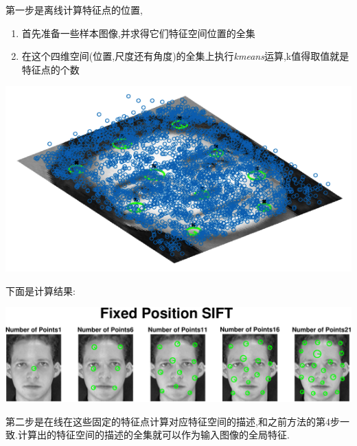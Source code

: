 	第一步是离线计算特征点的位置,
	\begin{enumerate}
		\item 首先准备一些样本图像,并求得它们特征空间位置的全集
		\item 在这个四维空间(位置,尺度还有角度)的全集上执行\textit{kmeans}运算,k值得取值就是特征点的个数
	\end{enumerate}
	
				\begin{center}
		\begin{minipage}[t]{\linewidth}
		\center
		{
		\includegraphics[width=\MyFactor\textwidth]{Img/c3/sift_face_kmeans} 
		}
		\end{minipage}
		\medskip
		\end{center}
		下面是计算结果:
			\begin{center}
		\begin{minipage}[t]{\linewidth}
		\center
		{
		\includegraphics[width=\MyFactor\textwidth]{Img/c3/sift_fixedp} 
		}
		\end{minipage}
		\medskip
		\end{center}
		
	第二步是在线在这些固定的特征点计算对应特征空间的描述,和之前方法的第4步一致.计算出的特征空间的描述的全集就可以作为输入图像的全局特征.


